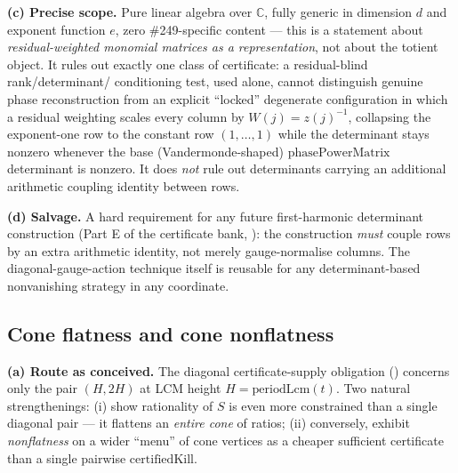 \textbf{(c) Precise scope.} Pure linear algebra over \(\mathbb C\), fully
generic in dimension \(d\) and exponent function \(e\), zero \#249-specific
content — this is a statement about \emph{residual-weighted monomial
matrices as a representation}, not about the totient object. It rules out
exactly one class of certificate: a residual-blind rank/determinant/
conditioning test, used alone, cannot distinguish genuine phase
reconstruction from an explicit ``locked'' degenerate configuration in which
a residual weighting scales every column by \(W(j)=z(j)^{-1}\), collapsing
the exponent-one row to the constant row \((1,\dots,1)\) while the
determinant stays nonzero whenever the base (Vandermonde-shaped)
\(\mathrm{phasePowerMatrix}\) determinant is nonzero. It does \emph{not}
rule out determinants carrying an additional arithmetic coupling identity
between rows.

\textbf{(d) Salvage.} A hard requirement for any future first-harmonic
determinant construction (Part E of the certificate bank,
): the construction \emph{must}
couple rows by an extra arithmetic identity, not merely gauge-normalise
columns. The diagonal-gauge-action technique itself is reusable for any
determinant-based nonvanishing strategy in any coordinate.

\subsection{Cone flatness and cone nonflatness}

\textbf{(a) Route as conceived.} The diagonal certificate-supply obligation
() concerns only the pair \((H,2H)\) at LCM
height \(H=\mathrm{periodLcm}(t)\). Two natural strengthenings: (i) show
rationality of \(S\) is even more constrained than a single diagonal pair —
it flattens an \emph{entire cone} of ratios; (ii) conversely, exhibit
\emph{nonflatness} on a wider ``menu'' of cone vertices as a cheaper
sufficient certificate than a single pairwise \(\mathrm{certifiedKill}\).

